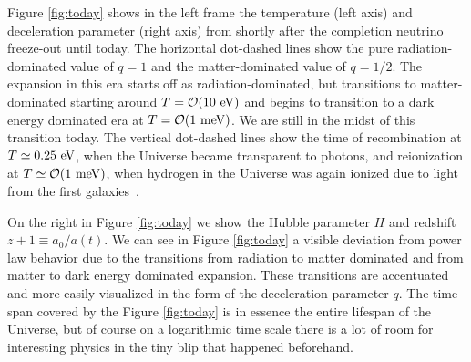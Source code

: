 Figure \ref{fig:today} shows in the left frame the temperature (left axis) and deceleration parameter (right axis) from shortly after the completion neutrino freeze-out until today. The horizontal dot-dashed lines show the pure radiation-dominated value of $q=1$ and the matter-dominated value of $q=1/2$. The expansion in this era starts off as radiation-dominated, but transitions to matter-dominated starting around $T=\mathcal{O}(10\text{ eV})$ and begins to transition to a dark energy dominated era at $T=\mathcal{O}(1\text{ meV})$. We are still in the midst of this transition today. The vertical dot-dashed lines show the time of recombination at $T\simeq0.25\text{ eV}$, when the Universe became transparent to photons, and reionization at $T\simeq {\cal O}(1\meV)$, when hydrogen in the Universe was again ionized due to light from the first galaxies~\cite{Zaroubi:2012in}. 

On the right in Figure \ref{fig:today} we show the Hubble parameter $H$ and redshift $z+1\equiv a_0/a(t)$. We can see in Figure \ref{fig:today} a visible deviation from power law behavior due to the transitions from radiation to matter dominated and from matter to dark energy dominated expansion. These transitions are accentuated and more easily visualized in the form of the deceleration parameter $q$. The time span covered by the Figure \ref{fig:today} is in essence the entire lifespan of the Universe, but of course on a logarithmic time scale there is a lot of room for interesting physics in the tiny blip that happened beforehand.


